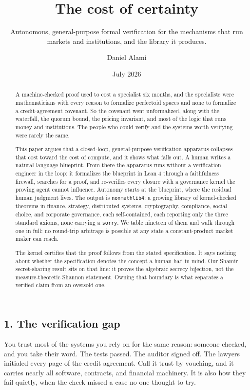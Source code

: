 \documentclass[
  11pt,
]{article}
\title{The cost of certainty}
\subtitle{Autonomous, general-purpose formal verification for the
mechanisms that run markets and institutions, and the library it
produces.}
\author{Daniel Alami}
\date{July 2026}
\renewcommand{\_}{\origunderscore\allowbreak}
\begin{document}
\maketitle
\begin{abstract}
A machine-checked proof used to cost a specialist six months, and the
specialists were mathematicians with every reason to formalize
perfectoid spaces and none to formalize a credit-agreement covenant. So
the covenant went unformalized, along with the waterfall, the quorum
bound, the pricing invariant, and most of the logic that runs money and
institutions. The people who could verify and the systems worth
verifying were rarely the same.

This paper argues that a closed-loop, general-purpose verification
apparatus collapses that cost toward the cost of compute, and it shows
what falls out. A human writes a natural-language blueprint. From there
the apparatus runs without a verification engineer in the loop: it
formalizes the blueprint in Lean 4 through a faithfulness firewall,
searches for a proof, and re-verifies every closure with a governance
kernel the proving agent cannot influence. Autonomy starts at the
blueprint, where the residual human judgment lives. The output is
\texttt{nonmathlib4}: a growing library of kernel-checked theorems in
finance, strategy, distributed systems, cryptography, compliance, social
choice, and corporate governance, each self-contained, each reporting
only the three standard axioms, none carrying a \texttt{sorry}. We table
nineteen of them and walk through one in full: no round-trip arbitrage
is possible at any state a constant-product market maker can reach.

The kernel certifies that the proof follows from the stated
specification. It says nothing about whether the specification denotes
the concept a human had in mind. Our Shamir secret-sharing result sits
on that line: it proves the algebraic secrecy bijection, not the
measure-theoretic Shannon statement. Owning that boundary is what
separates a verified claim from an oversold one.
\end{abstract}

\subsection{1. The verification gap}\label{1-the-verification-gap}

You trust most of the systems you rely on for the same reason: someone
checked, and you take their word. The tests passed. The auditor signed
off. The lawyers initialed every page of the credit agreement. Call it
trust by vouching, and it carries nearly all software, contracts, and
financial machinery. It is also how they fail quietly, when the check
missed a case no one thought to try.
\end{document}
